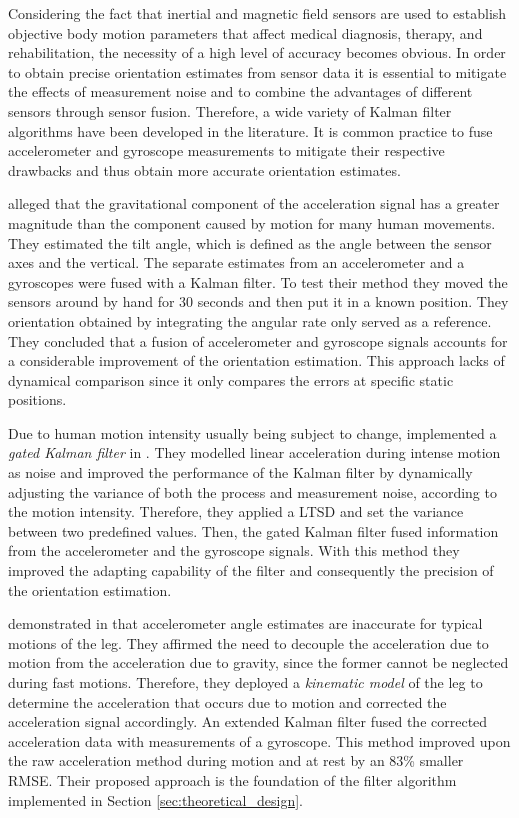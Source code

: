 Considering the fact that inertial and magnetic field sensors are used to establish objective body motion parameters that affect medical diagnosis, therapy, and rehabilitation, the necessity of a high level of accuracy becomes obvious. In order to obtain precise orientation estimates from sensor data it is essential to mitigate the effects of measurement noise and to combine the advantages of different  sensors through sensor fusion. Therefore, a wide variety of Kalman filter algorithms have been developed in the literature. It is common practice to fuse accelerometer and gyroscope measurements to mitigate their respective drawbacks and thus obtain more accurate orientation estimates.

\citeauthor{Luinge_orientation_acc_gyro_99} \cite{Luinge_orientation_acc_gyro_99} alleged that the gravitational component of the acceleration signal has a greater magnitude than the component caused by motion for many human movements. They estimated the tilt angle, which is defined as the angle between the sensor axes and the vertical. The separate estimates from an accelerometer and a gyroscopes were fused with a Kalman filter. To test their method they moved the sensors around by hand for 30 seconds and then put it in a known position. They orientation obtained by integrating the angular rate only served as a reference. They concluded that a fusion of accelerometer and gyroscope signals accounts for a considerable improvement of the orientation estimation. This approach lacks of dynamical comparison since it only compares the errors at specific static positions.

Due to human motion intensity usually being subject to change, \citeauthor{olivares_vicente_signal_2013} implemented a \emph{gated Kalman filter} in \cite{olivares_vicente_signal_2013}. They modelled linear acceleration during intense motion as noise and improved the performance of the Kalman filter by dynamically adjusting the variance of both the process and measurement noise, according to the motion intensity. Therefore, they applied a \gls{LTSD} and set the variance between two predefined values. Then, the gated Kalman filter fused information from the accelerometer and the gyroscope signals. With this method they improved the adapting capability of the filter and consequently the precision of the orientation estimation.

\citeauthor{bennett_motion_2014} demonstrated in \cite{bennett_motion_2014} that accelerometer angle estimates are inaccurate for typical motions of the leg. They affirmed the need to decouple the acceleration due to motion from the acceleration due to gravity, since the former cannot be neglected during fast motions. Therefore, they deployed a \emph{kinematic model} of the leg to determine the acceleration that occurs due to motion and corrected the acceleration signal accordingly. An extended Kalman filter fused the corrected acceleration data with measurements of a gyroscope. This method improved upon the raw acceleration method during motion and at rest by an 83\% smaller \gls{RMSE}. Their proposed approach is the foundation of the filter algorithm implemented in Section \ref{sec:theoretical_design}.

